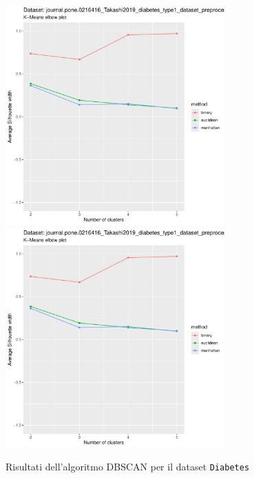 \documentclass[a4paper, 12pt]{report}
\begin{document}
			\begin{figure}[H]
				\centering
				\includegraphics[width = 0.75\textwidth, height = 0.45\textheight, page = 5]{
					results/results_Diabetes.csv.pdf
				}
				\includegraphics[width = 0.75\textwidth, height = 0.45\textheight, page = 6]{
					results/results_Diabetes.csv.pdf
				}
				\caption{Risultati dell'algoritmo DBSCAN per il dataset
				\texttt{Diabetes}}
				\label{fig:dbscan4}
			\end{figure}
\end{document}
